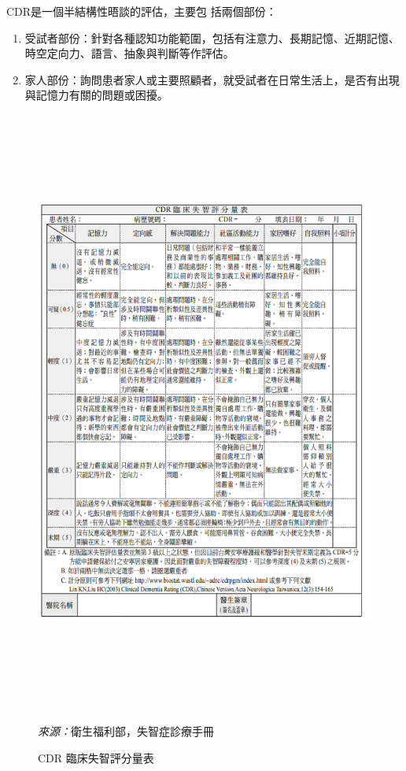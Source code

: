 \clearpage
CDR是一個半結構性晤談的評估，主要包
括兩個部份：
\begin{enumerate}
	\item
受試者部份：針對各種認知功能範圍，包括有注意力、長期記憶、近期記憶、時空定向力、語言、抽象與判斷等作評估。
\item
家人部份：詢問患者家人或主要照顧者，就受試者在日常生活上，是否有出現與記憶力有關的問題或困擾。
\end{enumerate}

\begin{figure}[H]
	\centering
	\centerline{\includegraphics[height=20cm]{pic/CDR.PNG}}
	\caption{CDR 臨床失智評分量表}
	\begin{minipage}{.7\linewidth}

		\footnotesize
		\emph{來源：}衛生福利部，失智症診療手冊

	\end{minipage}
	\label{fig:CDR}
\end{figure}

